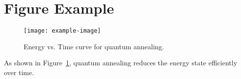 \documentclass{article}
\begin{document}
\section*{Figure Example}

\begin{figure}[h]
    \centering
    \texttt{[image: example-image]} %
    \caption{Energy vs. Time curve for quantum annealing.}
    \label{fig:energy_time}
\end{figure}

As shown in Figure~\ref{fig:energy_time}, quantum annealing reduces the energy state efficiently over time.
\end{document}
